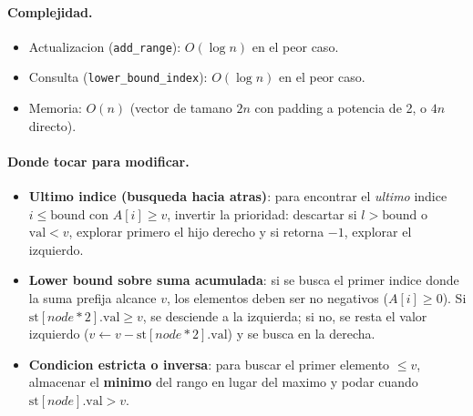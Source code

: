 \paragraph{Complejidad.}
\begin{itemize}\setlength\itemsep{0pt}
	\item Actualizacion (\texttt{add\_range}): $O(\log n)$ en el peor caso.
	\item Consulta (\texttt{lower\_bound\_index}): $O(\log n)$ en el peor caso.
	\item Memoria: $O(n)$ (vector de tamano $2n$ con padding a potencia de 2, o $4n$ directo).
\end{itemize}

\paragraph{Donde tocar para modificar.}
\begin{itemize}\setlength\itemsep{0pt}
	\item \textbf{Ultimo indice (busqueda hacia atras)}: para encontrar el \textit{ultimo} indice $i \le \text{bound}$ con $A[i] \ge v$, invertir la prioridad: descartar si $l > \text{bound}$ o $\text{val} < v$, explorar primero el hijo derecho y si retorna $-1$, explorar el izquierdo.
	\item \textbf{Lower bound sobre suma acumulada}: si se busca el primer indice donde la suma prefija alcance $v$, los elementos deben ser no negativos ($A[i] \ge 0$). Si $\text{st}[node*2].\text{val} \ge v$, se desciende a la izquierda; si no, se resta el valor izquierdo ($v \leftarrow v - \text{st}[node*2].\text{val}$) y se busca en la derecha.
	\item \textbf{Condicion estricta o inversa}: para buscar el primer elemento $\le v$, almacenar el \textbf{minimo} del rango en lugar del maximo y podar cuando $\text{st}[node].\text{val} > v$.
\end{itemize}


